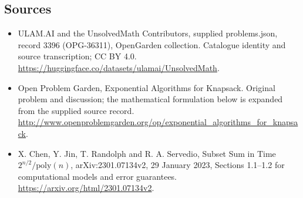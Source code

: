 \documentclass[11pt,a4paper]{article}
\begin{document}
\subsection{Sources}
\begin{itemize}
\item[S1] ULAM.AI and the UnsolvedMath Contributors, supplied problems.json, record 3396 (OPG-36311), OpenGarden collection. Catalogue identity and source transcription; CC BY 4.0.
\url{https://huggingface.co/datasets/ulamai/UnsolvedMath}.
\item[S2] Open Problem Garden, Exponential Algorithms for Knapsack. Original problem and discussion; the mathematical formulation below is expanded from the supplied source record.
\url{http://www.openproblemgarden.org/op/exponential_algorithms_for_knapsack}.
\item[S3] X. Chen, Y. Jin, T. Randolph and R. A. Servedio, Subset Sum in Time $2^{n/2}/\mathrm{poly}(n)$, arXiv:2301.07134v2, 29 January 2023, Sections 1.1--1.2 for computational models and error guarantees.
\url{https://arxiv.org/html/2301.07134v2}.
\end{itemize}
\end{document}
